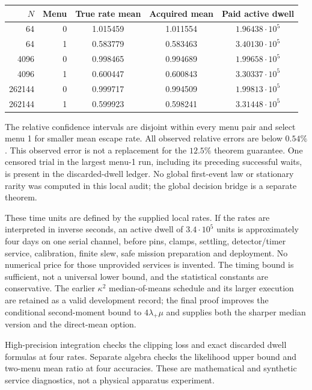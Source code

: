 \documentclass[11pt]{article}
\begin{document}
\begin{center}
\begin{tabular}{rrccc}
\toprule
$N$ & Menu & True rate mean & Acquired mean & Paid active dwell\\
\midrule
64 & 0 & 1.015459 & 1.011554 & $1.96438\cdot10^5$\\
64 & 1 & 0.583779 & 0.583463 & $3.40130\cdot10^5$\\
4096 & 0 & 0.998465 & 0.994689 & $1.99658\cdot10^5$\\
4096 & 1 & 0.600447 & 0.600843 & $3.30337\cdot10^5$\\
262144 & 0 & 0.999717 & 0.994509 & $1.99813\cdot10^5$\\
262144 & 1 & 0.599923 & 0.598241 & $3.31448\cdot10^5$\\
\bottomrule
\end{tabular}
\end{center}
The relative confidence intervals are disjoint within every menu pair
and select menu 1 for smaller mean escape rate. All observed relative
errors are below $0.54\%$. This observed error is not a replacement for
the $12.5\%$ theorem guarantee. One censored trial in the largest menu-1
run, including its preceding successful waits, is present in the
discarded-dwell ledger. No global first-event law or stationary rarity
was computed in this local audit; the global decision bridge is a
separate theorem.

These time units are defined by the supplied local rates. If the rates
are interpreted in inverse seconds, an active dwell of $3.4\cdot10^5$
units is approximately four days on one serial channel, before pins,
clamps, settling, detector/timer service, calibration, finite slew, safe
mission preparation and deployment. No numerical price for those
unprovided services is invented. The timing bound is sufficient, not a
universal lower bound, and the statistical constants are conservative.
The earlier $\kappa^2$ median-of-means schedule and its larger execution
are retained as a valid development record; the final proof improves
the conditional second-moment bound to $4\lambda_+\mu$ and supplies
both the sharper median version and the direct-mean option.

High-precision integration checks the clipping loss and exact discarded
dwell formulas at four rates. Separate algebra checks the likelihood
upper bound and two-menu mean ratio at four accuracies. These are
mathematical and synthetic service diagnostics, not a physical apparatus
experiment.
\end{document}

